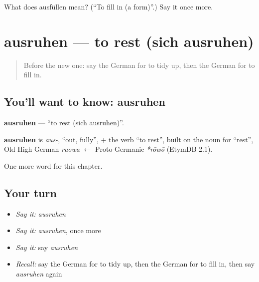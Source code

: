 \begin{tcolorbox}[breakable,colback=teal!4,colframe=teal!35!black,title={Before you move on}]
What does ausfüllen mean? (\textquotedblleft{}To fill in (a form)\textquotedblright{}.) Say it once more.
\end{tcolorbox}
\section[ausruhen]{ausruhen — to rest (sich ausruhen)}

\label{lesson:GE-C175-ausruhen}



\begin{quote}
Before the new one: say the German for to tidy up, then the German for to fill in.
\end{quote}

\subsection*{You'll want to know: ausruhen}
\textbf{ausruhen} — \textquotedblleft{}to rest (sich ausruhen)\textquotedblright{}.

\begin{cousinweb}
\textbf{ausruhen} is \emph{aus-}, \textquotedblleft{}out, fully\textquotedblright{}, + the verb \textquotedblleft{}to rest\textquotedblright{}, built on the noun for \textquotedblleft{}rest\textquotedblright{}, Old High German \emph{ruowa} $\leftarrow$ Proto-Germanic \emph{*rōwō} (EtymDB 2.1).
\end{cousinweb}

\begin{grammarlens}[title={What you've built}]
One more word for this chapter.
\end{grammarlens}

\subsection*{Your turn}
\begin{itemize}
\raggedright
  \item \emph{Say it:} \emph{ausruhen}
  \item \emph{Say it:} \emph{ausruhen}, once more
  \item \emph{Say it:} say \emph{ausruhen}
  \item \emph{Recall:} say the German for to tidy up, then the German for to fill in, then say \emph{ausruhen} again
\end{itemize}

